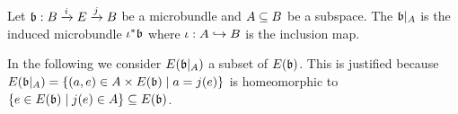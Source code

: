 \begin{myexample}    
    Let $\bb: \bundle{B}{E}{i}{j}$ be a microbundle and $A \sub B$ be a subspace.
    The  $\bb\restr{A}$ is the induced microbundle $\iota^*\bb$ where $\iota: A \incl B$ is the inclusion map.
\end{myexample}

\begin{remark}
    In the following we consider $E(\bb\restr{A})$ a subset of $E(\bb)$.
    This is justified because
    $E(\bb\restr{A}) = \{ (a, e) \in A \times E(\bb) \mid a = j(e) \}$ is homeomorphic to $\{ e \in E(\bb) \mid j(e) \in A \} \sub E(\bb)$.
\end{remark}